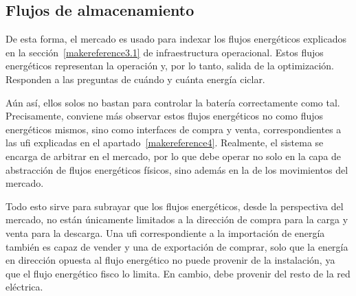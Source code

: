 \begin{table}[ht]
  \centering
  \caption[Ajustes del mercado intradiario en cambios de hora de invierno.]{Ajustes del mercado intradiario en cambios de hora de invierno.}%
  \label{tab:cambio-hora-invierno}
\end{table}

\subsection{Flujos de almacenamiento}%
\label{makereference5.1.2}

De esta forma, el mercado es usado para indexar los flujos energéticos explicados en la sección~\ref{makereference3.1} de infraestructura operacional. Estos flujos energéticos representan la operación y, por lo tanto, salida de la optimización. Responden a las preguntas de cuándo y cuánta energía ciclar.

Aún así, ellos solos no bastan para controlar la batería correctamente como tal. Precisamente, conviene más observar estos flujos energéticos no como flujos energéticos mismos, sino como interfaces de compra y venta, correspondientes a las \gls{ufi} explicadas en el apartado~\ref{makereference4}. Realmente, el sistema se encarga de arbitrar en el mercado, por lo que debe operar no solo en la capa de abstracción de flujos energéticos físicos, sino además en la de los movimientos del mercado.

Todo esto sirve para subrayar que los flujos energéticos, desde la perspectiva del mercado, no están únicamente limitados a la dirección de compra para la carga y venta para la descarga. Una \gls{ufi} correspondiente a la importación de energía también es capaz de vender y una de exportación de comprar, solo que la energía en dirección opuesta al flujo energético no puede provenir de la instalación, ya que el flujo energético fisco lo limita. En cambio, debe provenir del resto de la red eléctrica.

